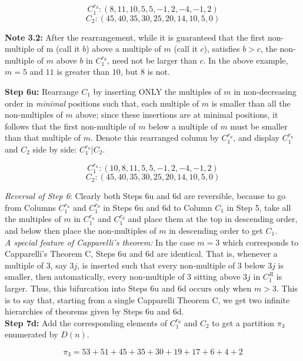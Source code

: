 \documentclass[12pt,a4paper]{amsart}
\theoremstyle{definition}
\theoremstyle{notation}
\theoremstyle{corollary}
\begin{document}
$$
C^{r_d}_1: (8, 11, 10, 5, 5, -1, 2, -4, -1, 2)
$$
$$
C_2: (45, 40, 35, 30, 25, 20, 14, 10, 5, 0)
$$

\textbf{Note 3.2:} After the rearrangement, while it is
guaranteed that the first non-multiple of m
(call it $b$) above  a multiple of $m$ (call it $c$), 
satisfies $b>c$, the non-multiple of $m$ above 
$b$ in $C^{r_d}_1$, need not be larger than $c$. 
In the above example,  $m=5$ and $11$ is greater than $10$, but $8$ is not.

\medskip

\textbf{Step 6u:} Rearrange $C_1$ by inserting ONLY the multiples of $m$ in non-decreasing order in {\it{minimal}} positions such that, each multiple of $m$ is smaller than
all the non-multiples of $m$ above; since these insertions are at minimal positions, it follows that the first non-multiple of $m$ below a multiple of $m$ must be
smaller than that multiple of $m$. Denote this rearranged column by $C^{r_u}_1$, and display $C^{r_u}_1$ and $C_2$ side by side: $C^{r_u}_1|C_2$. 

$$
C^{r_u}_1: ( 10,8, 11, 5, 5, -1, 2, -4, -1, 2)
$$
$$
C_2: (45, 40, 35, 30, 25, 20, 14, 10, 5, 0)
$$

\medskip

{\it{Reversal of Step 6}}: Clearly both Steps 6u and 6d are reversible, because to go from Columns $C^{r_u}_1$ and $C^{r_d}_1$ in Steps 6u and 6d to Column $C_1$ in Step 5, take all the multiples of $m$ in $C^{r_u}_1$ and $C^{r_d}_1$ and place them at the top in descending order, and below then place the non-multiples of $m$ in descending order to get $C_1$.\\

{\it{A special feature of Capparelli's theorem:}} In the case $m=3$ which corresponds to Capparelli's Theorem C, Steps 6u and 6d are identical. That is, whenever a multiple of $3$, say $3j$, is inserted such that every non-multiple of $3$ below
$3j$ is smaller, then automatically, every non-multiple of 3 sitting above $3j$ in $C^R_1$ is larger. Thus, this bifurcation into Steps 6u and 6d occurs only when $m>3$. This is to say that, starting from a single Capparelli Theorem C, we get two infinite hierarchies of theorems given by Steps 6u and 6d.\\



\textbf{Step 7d:} Add the corresponding elements of $C^{r_d}_1$ and $C_2$ to get a partition
$\pi_3$ enumerated by $D(n)$.

$$
\pi_3= 53+51+45+35+30+19+17+6+4+2
$$
\medskip
\end{document}
